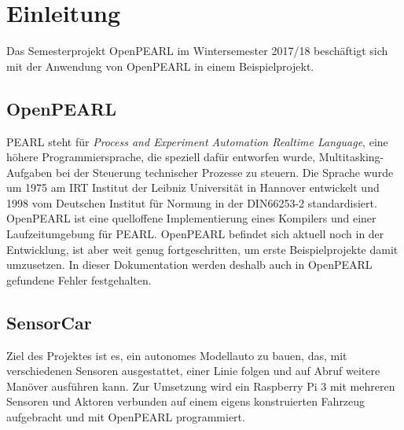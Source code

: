 \chapter{Einleitung}

	Das Semesterprojekt OpenPEARL im Wintersemester 2017/18 beschäftigt sich mit der Anwendung von OpenPEARL in einem Beispielprojekt. 
	
	\section{OpenPEARL}
	PEARL steht für \emph{Process and Experiment Automation Realtime Language}, eine höhere Programmiersprache, die speziell dafür entworfen wurde, Multitasking-Aufgaben bei der Steuerung technischer Prozesse zu steuern. Die Sprache wurde um 1975 am IRT Institut der Leibniz Universität in Hannover entwickelt und 1998 vom Deutschen Institut für Normung in der DIN66253-2 standardisiert.\\
	OpenPEARL ist eine quelloffene Implementierung eines Kompilers und einer Laufzeitumgebung für PEARL. OpenPEARL befindet sich aktuell noch in der Entwicklung, ist aber weit genug fortgeschritten, um erste Beispielprojekte damit umzusetzen. In dieser Dokumentation werden deshalb auch in OpenPEARL gefundene Fehler festgehalten.
	
	\section{SensorCar}
	Ziel des Projektes ist es, ein autonomes Modellauto zu bauen, das, mit verschiedenen Sensoren ausgestattet, einer Linie folgen und auf Abruf weitere Manöver ausführen kann. Zur Umsetzung wird ein Raspberry Pi 3 mit mehreren Sensoren und Aktoren verbunden auf einem eigens konstruierten Fahrzeug aufgebracht und mit OpenPEARL programmiert. 
	
	
	